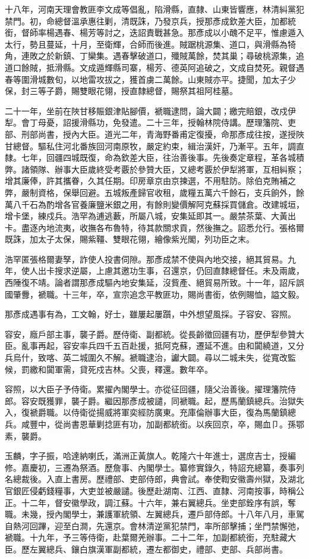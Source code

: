 \begin{pinyinscope}
十八年，河南天理會教匪李文成等倡亂，陷滑縣，直隸、山東皆響應，林清糾黨犯禁門。初，命總督溫承惠往剿，清既誅，乃發京兵，授那彥成欽差大臣，加都統銜，督師率楊遇春、楊芳等討之，迭詔責戰甚急。那彥成以小醜不足平，惟慮遁入太行，勢且蔓延，十月，至衛輝，合師而後進。賊踞桃源集、道口，與滑縣為犄角，連敗之於新鎮、丁欒集。遇春擊破道口，殲賊萬餘，焚其巢；尋破桃源集，追道口餘賊，抵滑縣。文成遁輝縣司寨，楊芳、德英阿追破之，文成自焚死。親督遇春等圍滑城數旬，以地雷攻拔之，獲首虜二萬餘。山東賊亦平。捷聞，加太子少保，封三等子爵，賜雙眼花翎，授直隸總督，賜祭其祖阿桂墓。

二十一年，坐前在陜甘移賑銀津貼腳價，褫職逮問，論大闢；繳完賠銀，改戍伊犁。會丁母憂，詔援滑縣功，免發遣。二十三年，授翰林院侍講。歷理籓院、吏部、刑部尚書，授內大臣。道光二年，青海野番甫定復擾，命那彥成往按，遂授陜甘總督。驅私住河北番族回河南原牧，嚴定約束，緝治漢奸，乃漸平。五年，調直隸。七年，回疆四城既復，命為欽差大臣，往治善後事。先後奏定章程，革各城積弊。諸領隊、辦事大臣歲終受考覈於參贊大臣，又總考覈於伊犁將軍，互相糾察；增其廉俸，許其攜眷，久其任期。印房章京由京揀選，不用駐防。除伯克賄補之弊，嚴制資格，保舉回避。五城叛產歸官收租，歲糧五萬六千餘石，支兵餉外，餘萬八千石為酌增各官養廉鹽米銀之用，有餘則變價解阿克蘇採買儲倉。改建城垣，增卡堡，練戍兵。浩罕為逋逃藪，所屬八城，安集延即其一。嚴禁茶葉、大黃出卡。盡逐內地流夷，收撫各布魯特，待其款關求貢，然後撫之。詔悉允行。張格爾既誅，加太子太保，賜紫韁、雙眼花翎，繪像紫光閣，列功臣之末。

浩罕匿張格爾妻孥，詐使人投書伺隙。那彥成禁不使與內地交接，絕其貿易。九年，使人出卡搜求逆屬，上慮其邀功生事，召還京，仍回直隸總督任。未及兩歲，西陲復不靖。論者謂那彥成驅內地安集延，沒貲產、絕貿易所致。十一年，詔斥誤國肇釁，褫職。十三年，卒，宣宗追念平教匪功，賜尚書銜，依例賜恤，謚文毅。

那彥成遇事有為，工文翰，好士，雖屢起屢躓，中外想望風採。子容安、容照。

容安，廕戶部主事，襲子爵。歷侍衛、副都統。從長齡徵回疆有功，歷伊犁參贊大臣。亂事再起，容安率兵四千五百赴援，抵阿克蘇，遷延不進。由和闐繞道，又分兵烏什，致喀、英二城圍久不解。褫職逮治，讞大闢。尋以二城未失，從寬改監候，罰繳和闐軍需，貸死戍吉林。父喪，釋還。數年卒。

容照，以大臣子予侍衛。累擢內閣學士。亦從征回疆，隨父治善後。擢理籓院侍郎。容安既獲罪，襲子爵。繼因那彥成被譴，同褫職。起，歷馬蘭鎮總兵。治獄失入，復褫爵職。以侍衛從揚威將軍奕經防廣東。充庫倫辦事大臣，復為馬蘭鎮總兵。咸豐中，從尚書恩華剿捻匪有功，加副都統銜。以疾回京，卒，賜血⼙。孫鄂素，襲爵。

玉麟，字子振，哈達納喇氏，滿洲正黃旗人。乾隆六十年進士，選庶吉士，授編修。嘉慶初，三遷為祭酒。歷詹事、內閣學士。纂修實錄久，特詔充總纂，奏事列名總裁後。入直上書房。歷禮部、吏部侍郎，典會試。奉使鞫安徽壽州獄，及湖北官銀匠侵虧錢糧事，大吏並被嚴譴。後歷赴湖南、江西、直隸、河南按事，時稱公正。十二年，督安徽學政，調江蘇。十六年，兼右翼總兵。坐吏部銓序有誤，奪職。未幾，授內閣學士，兼護軍統領、左翼總兵，遷戶部侍郎。十八年八月，車駕自熱河回蹕，迎至白澗，先還京。會林清逆黨犯禁門，率所部擊捕；坐門禁懈弛，褫職。十九年，予三等侍衛，赴葉爾羌辦事。二十二年，加副都統銜，充駐藏大臣。歷左翼總兵、鑲白旗漢軍副都統，遷左都御史，禮部、吏部、兵部尚書。


\end{pinyinscope}

